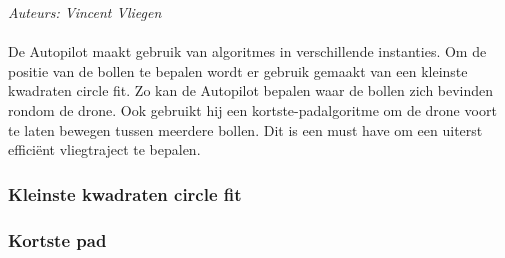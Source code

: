 {\em Auteurs: Vincent  Vliegen}
\\
\\
\noindent
De Autopilot maakt gebruik van algoritmes in verschillende instanties. Om de positie van de bollen te bepalen wordt er gebruik gemaakt van een kleinste kwadraten circle fit. Zo kan de Autopilot bepalen waar de bollen zich bevinden rondom de drone. Ook gebruikt hij een kortste-padalgoritme om de drone voort te laten bewegen tussen meerdere bollen. Dit is een must have om een uiterst effici\"ent vliegtraject te bepalen.

\subsubsection{Kleinste kwadraten circle fit}
\label{subsec: Kleinste kwadraten circle fit}


\subsubsection{Kortste pad}
\label{subsec: Kortste pad}
